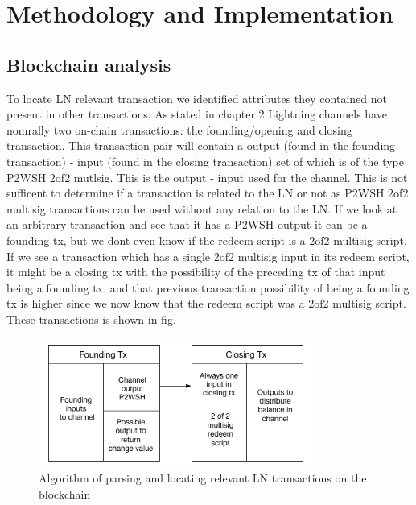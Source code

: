 \chapter{Methodology and Implementation}
\label{chap:metodology}



\section{Blockchain analysis}



To locate LN relevant transaction we identified attributes they contained not present in other transactions. As stated in chapter 2  Lightning channels have nomrally two on-chain transactions: the founding/opening and closing transaction. This transaction pair will contain a output (found in the founding transaction) - input (found in the closing transaction) set of which is of the type P2WSH 2of2 mutlsig. This is the output - input used for the channel. This is not sufficent to determine if a transaction is related to the LN or not as P2WSH 2of2 multisig transactions can be used without any relation to the LN. If we look at an arbitrary transaction and see that it has a P2WSH output it can be a founding tx, but we dont even know if the redeem script is a 2of2 multisig script. If we see a transaction which has a single 2of2 multisig input in its redeem script, it might be a closing tx with the possibility of the preceding tx of that input being a founding tx, and that previous transaction possibility of being a founding tx is higher since we now know that the redeem script was a 2of2 multisig script.  These transactions is shown in fig.

\begin{figure}[h]
    \centering
    \includegraphics[width=9cm]{figures/lnchain.png}
    \caption{Algorithm of parsing and locating relevant LN transactions on the blockchain}
    \label{fig:htlc_bc}
\end{figure}


